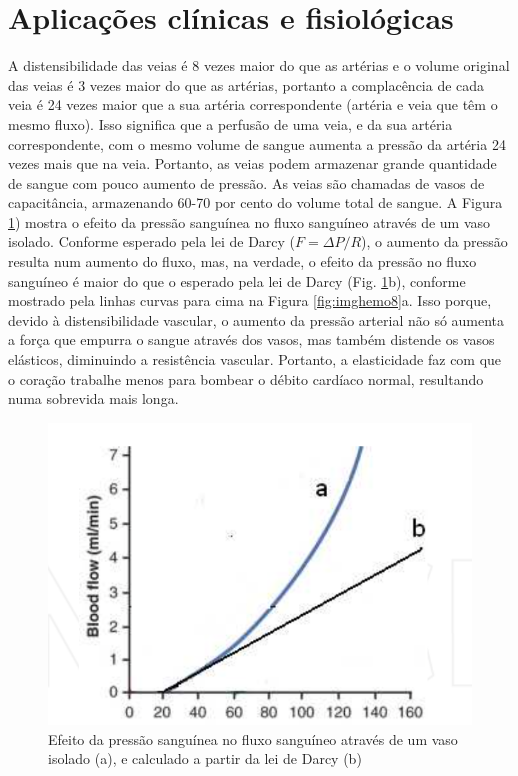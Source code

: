 \documentclass[
  portuguese,
  ]{book}
\begin{document}
\hypertarget{aplicauxe7uxf5es-cluxednicas-e-fisioluxf3gicas}{%
\section{Aplicações clínicas e fisiológicas}\label{aplicauxe7uxf5es-cluxednicas-e-fisioluxf3gicas}}

A distensibilidade das veias é 8 vezes maior do que as artérias e o volume original das veias é 3 vezes maior do que as artérias, portanto a complacência de cada veia é 24 vezes maior que a sua artéria correspondente (artéria e veia que têm o mesmo fluxo). Isso significa que a perfusão de uma veia, e da sua artéria correspondente, com o mesmo volume de sangue aumenta a pressão da artéria 24 vezes mais que na veia. Portanto, as veias podem armazenar grande quantidade de sangue com pouco aumento de pressão. As veias são chamadas de vasos de capacitância, armazenando 60-70 por cento do volume total de sangue.
A Figura \ref{fig:imghemo9}) mostra o efeito da pressão sanguínea no fluxo sanguíneo através de um vaso isolado. Conforme esperado pela lei de Darcy (\(F = \Delta P/R\)), o aumento da pressão resulta num aumento do fluxo, mas, na verdade, o efeito da pressão no fluxo sanguíneo é maior do que o esperado pela lei de Darcy (Fig. \ref{fig:imghemo9}b), conforme mostrado pela linhas curvas para cima na Figura \ref{fig:imghemo8}a. Isso porque, devido à distensibilidade vascular, o aumento da pressão arterial não só aumenta a força que empurra o sangue através dos vasos, mas também distende os vasos elásticos, diminuindo a resistência vascular. Portanto, a elasticidade faz com que o coração trabalhe menos para bombear o débito cardíaco normal, resultando numa sobrevida mais longa.

\begin{figure}

{\centering \includegraphics{img/hemo_9} 

}

\caption{Efeito da pressão sanguínea no fluxo sanguíneo através de um vaso isolado (a), e calculado a partir da lei de Darcy (b)}\label{fig:imghemo9}
\end{figure}
\end{document}
